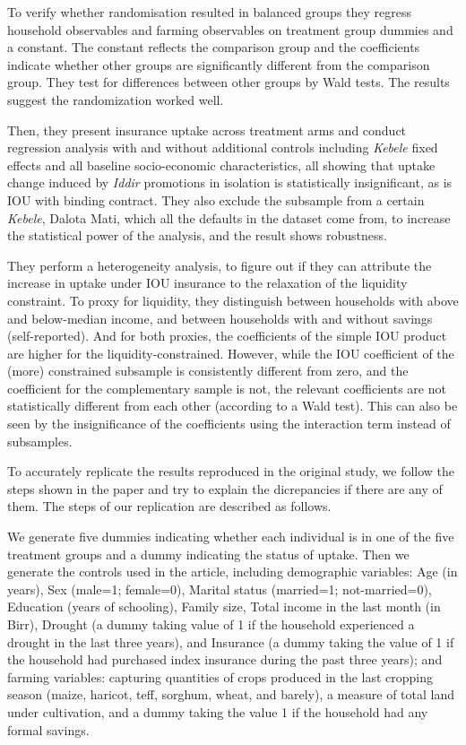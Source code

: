 \documentclass[AER]{AEA}
\begin{document}
To verify whether randomisation resulted in balanced groups they regress
household observables and farming observables on treatment group dummies
and a constant. The constant reflects the comparison group and the
coefficients indicate whether other groups are significantly different
from the comparison group. They test for differences between other
groups by Wald tests. The results suggest the randomization worked well.

Then, they present insurance uptake across treatment arms and conduct
regression analysis with and without additional controls including
\textit{Kebele} fixed effects and all baseline socio-economic
characteristics, all showing that uptake change induced by
\textit{Iddir} promotions in isolation is statistically insignificant,
as is IOU with binding contract. They also exclude the subsample from a
certain \textit{Kebele}, Dalota Mati, which all the defaults in the
dataset come from, to increase the statistical power of the analysis,
and the result shows robustness.

They perform a heterogeneity analysis, to figure out if they can
attribute the increase in uptake under IOU insurance to the relaxation
of the liquidity constraint. To proxy for liquidity, they distinguish
between households with above and below-median income, and between
households with and without savings (self-reported). And for both
proxies, the coefficients of the simple IOU product are higher for the
liquidity-constrained. However, while the IOU coefficient of the (more)
constrained subsample is consistently different from zero, and the
coefficient for the complementary sample is not, the relevant
coefficients are not statistically different from each other (according
to a Wald test). This can also be seen by the insignificance of the
coefficients using the interaction term instead of subsamples.

To accurately replicate the results reproduced in the original study, we
follow the steps shown in the paper and try to explain the dicrepancies
if there are any of them. The steps of our replication are described as
follows.

We generate five dummies indicating whether each individual is in one of
the five treatment groups and a dummy indicating the status of uptake.
Then we generate the controls used in the article, including demographic
variables: Age (in years), Sex (male=1; female=0), Marital status
(married=1; not-married=0), Education (years of schooling), Family size,
Total income in the last month (in Birr), Drought (a dummy taking value
of 1 if the household experienced a drought in the last three years),
and Insurance (a dummy taking the value of 1 if the household had
purchased index insurance during the past three years); and farming
variables: capturing quantities of crops produced in the last cropping
season (maize, haricot, teff, sorghum, wheat, and barely), a measure of
total land under cultivation, and a dummy taking the value 1 if the
household had any formal savings.
\end{document}
